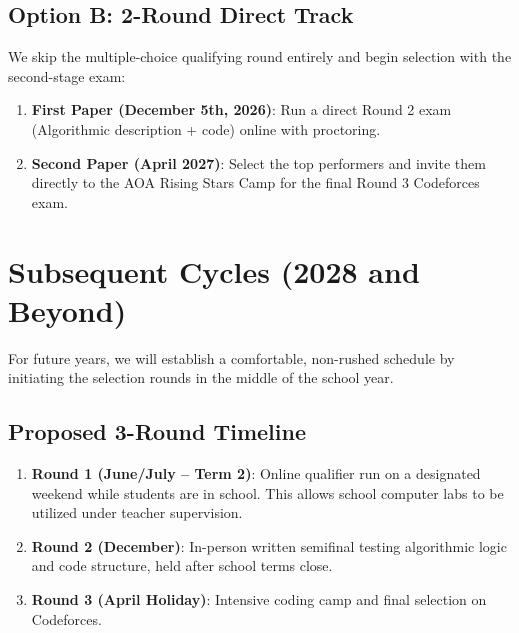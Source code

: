 \documentclass[11pt]{article}
\begin{document}
\subsection{Option B: 2-Round Direct Track}
We skip the multiple-choice qualifying round entirely and begin selection with the second-stage exam:
\begin{enumerate}
    \item \textbf{First Paper (December 5th, 2026)}: Run a direct Round 2 exam (Algorithmic description + code) online with proctoring.
    \item \textbf{Second Paper (April 2027)}: Select the top performers and invite them directly to the AOA Rising Stars Camp for the final Round 3 Codeforces exam.
\end{enumerate}

\section{Subsequent Cycles (2028 and Beyond)}
For future years, we will establish a comfortable, non-rushed schedule by initiating the selection rounds in the middle of the school year. 

\subsection{Proposed 3-Round Timeline}
\begin{enumerate}
    \item \textbf{Round 1 (June/July -- Term 2)}: Online qualifier run on a designated weekend while students are in school. This allows school computer labs to be utilized under teacher supervision.
    \item \textbf{Round 2 (December)}: In-person written semifinal testing algorithmic logic and code structure, held after school terms close.
    \item \textbf{Round 3 (April Holiday)}: Intensive coding camp and final selection on Codeforces.
\end{enumerate}
\end{document}
